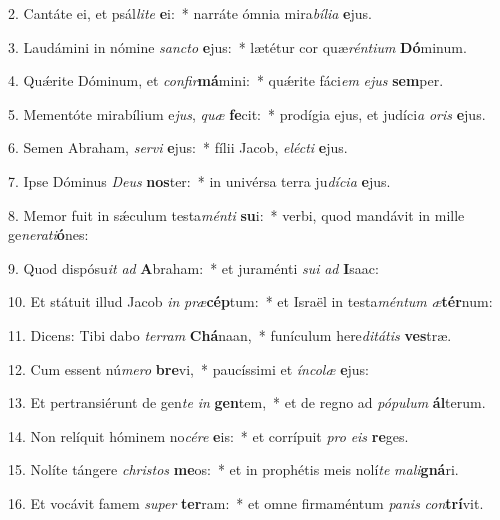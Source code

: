 2. Cantáte ei, et psál\textit{li}\textit{te} \textbf{e}i:~*  narráte ómnia mira\textit{bí}\textit{li}\textit{a} \textbf{e}jus.\

3. Laudámini in nómine \textit{sanc}\textit{to} \textbf{e}jus:~*  lætétur cor quæ\textit{rén}\textit{ti}\textit{um} \textbf{Dó}minum.\

4. Quǽrite Dóminum, et \textit{con}\textit{fir}\textbf{má}mini:~*  quǽrite fáci\textit{em} \textit{e}\textit{jus} \textbf{sem}per.\

5. Mementóte mirabílium e\textit{jus}, \textit{quæ} \textbf{fe}cit:~*  prodígia ejus, et judíci\textit{a} \textit{o}\textit{ris} \textbf{e}jus.\

6. Semen Abraham, \textit{ser}\textit{vi} \textbf{e}jus:~*  fílii Jacob, \textit{e}\textit{léc}\textit{ti} \textbf{e}jus.\

7. Ipse Dóminus \textit{De}\textit{us} \textbf{nos}ter:~*  in univérsa terra ju\textit{dí}\textit{ci}\textit{a} \textbf{e}jus.\

8. Memor fuit in sǽculum testa\textit{mén}\textit{ti} \textbf{su}i:~*  verbi, quod mandávit in mille ge\textit{ne}\textit{ra}\textit{ti}\textbf{ó}nes:\

9. Quod dispósu\textit{it} \textit{ad} \textbf{A}braham:~*  et juraménti \textit{su}\textit{i} \textit{ad} \textbf{I}saac:\

10. Et státuit illud Jacob \textit{in} \textit{præ}\textbf{cép}tum:~*  et Israël in testa\textit{mén}\textit{tum} \textit{æ}\textbf{tér}num:\

11. Dicens: Tibi dabo \textit{ter}\textit{ram} \textbf{Chá}naan,~*  funículum here\textit{di}\textit{tá}\textit{tis} \textbf{ves}træ.\

12. Cum essent nú\textit{me}\textit{ro} \textbf{bre}vi,~*  paucíssimi et \textit{ín}\textit{co}\textit{læ} \textbf{e}jus:\

13. Et pertransiérunt de gen\textit{te} \textit{in} \textbf{gen}tem,~*  et de regno ad \textit{pó}\textit{pu}\textit{lum} \textbf{ál}terum.\

14. Non relíquit hóminem no\textit{cé}\textit{re} \textbf{e}is:~*  et corrípuit \textit{pro} \textit{e}\textit{is} \textbf{re}ges.\

15. Nolíte tángere \textit{chris}\textit{tos} \textbf{me}os:~*  et in prophétis meis nolí\textit{te} \textit{ma}\textit{li}\textbf{gná}ri.\

16. Et vocávit famem \textit{su}\textit{per} \textbf{ter}ram:~*  et omne firmaméntum \textit{pa}\textit{nis} \textit{con}\textbf{trí}vit.\


